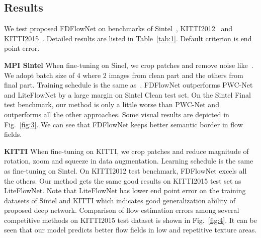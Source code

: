 \documentclass{article}
\begin{document}
\subsection{Results}
We test proposed FDFlowNet on benchmarks of Sintel~\cite{Butler:ECCV:2012}, KITTI2012~\cite{Geiger2012CVPR} and KITTI2015~\cite{Menze2015CVPR}. Detailed results are listed in Table~\ref{tab:1}. Default criterion is end point error.

{\noindent \bf MPI Sintel} When fine-tuning on Sinel, we crop  patches and remove noise like~\cite{Sun_2018_CVPR, Hui_2018_CVPR}. We adopt batch size of 4 where 2 images from clean part and the others from final part. Training schedule is the same as~\cite{Sun_2018_CVPR}. FDFlowNet outperforms PWC-Net and LiteFlowNet by a large margin on Sintel Clean test set. On the Sintel Final test benchmark, our method is only a little worse than PWC-Net and outperforms all the other approaches. Some visual results are depicted in Fig.~\ref{fig:3}. We can see that FDFlowNet keeps better semantic border in flow fields.

{\noindent \bf KITTI} When fine-tuning on KITTI, we crop  patches and reduce magnitude of rotation, zoom and squeeze in data augmentation. Learning schedule is the same as fine-tuning on Sintel. On KITTI2012 test benchmark, FDFlowNet excels all the others. Our method gets the same good results on KITTI2015 test set as LiteFlowNet. Note that LiteFlowNet has lower end point error on the training datasets of Sintel and KITTI which indicates good generalization ability of proposed deep network. Comparison of flow estimation errors among several competitive methods on KITTI2015 test dataset is shown in Fig.~\ref{fig:4}. It can be seen that our model predicts better flow fields in low and repetitive texture areas.

\begin{table}[t]
\small
\renewcommand\arraystretch{1.2}
\begin{center}
\centering
{}
\end{center}
\caption
{Ablation study of different variants of FDFlowNet.}
\label{tab:2}
\end{table}
\end{document}
